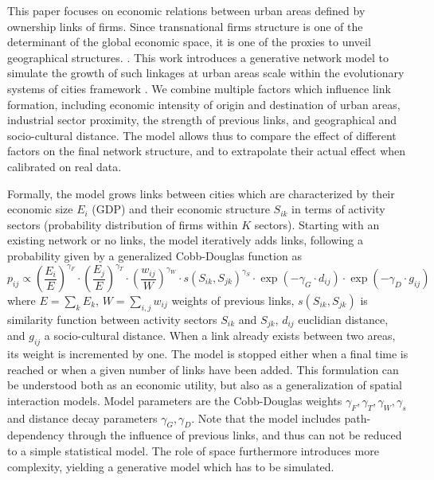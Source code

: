 \documentclass[10pt,letterpaper]{article}
\newcommand{\ea}[1]{{\color{blue}  #1}}
\begin{document}
This paper focuses on economic relations between urban areas defined by ownership links of firms. Since transnational firms structure is one of the determinant of the global economic space, it is one of the proxies to unveil geographical structures. \cite{2019arXiv191014652Z}. 
\ea{This work} introduces a generative network model to simulate the growth of such linkages at urban areas scale within the evolutionary systems of cities framework \cite{pumain2018evolutionary}. 
We combine multiple factors which influence link formation, including economic intensity of origin and destination of urban areas, industrial sector proximity, the strength of previous links, and geographical and socio-cultural distance. The model allows thus to compare the effect of different factors on the final network structure, and to extrapolate their actual effect when calibrated on real data.



Formally, the model grows links between cities which are characterized by their economic size $E_i$ (GDP) and their economic structure $S_{ik}$ in terms of activity sectors (probability distribution of firms within $K$ sectors). Starting with an existing network or no links, the model iteratively adds links, following a probability given by a generalized Cobb-Douglas function \cite{vilcu2011geometric} as 
\[
p_{ij} \propto \left(\frac{E_{i}}{E}\right)^{\gamma_F} \cdot \left(\frac{E_{j}}{E}\right)^{\gamma_T} \cdot \left(\frac{w_{ij}}{W}\right)^{\gamma_W} \cdot s\left(S_{ik},S_{jk}\right)^{\gamma_S} \cdot \exp \left(- \gamma_G \cdot d_{ij}\right) \cdot \exp \left(- \gamma_D \cdot g_{ij}\right)
\]
where $E  =  \sum_k E_k$, $W  = \sum_{i,j} w_{ij}$ weights of previous links, \ea{$s(S_{ik},S_{jk})$ is similarity function between activity sectors $S_{ik}$ and $S_{jk}$}, $d_{ij}$ euclidian distance, and $g_{ij}$ a socio-cultural distance. When a link already exists between two areas, its weight is incremented by one. The model is stopped either when a final time is reached or when a given number of links have been added. This formulation can be understood both as an economic utility, but also as a generalization of spatial interaction models. Model parameters are the Cobb-Douglas weights $\gamma_F,\gamma_T,\gamma_W,\gamma_s$ and \ea{distance}
decay parameters $\gamma_G,\gamma_D$. Note that the model includes path-dependency through the influence of previous links, and thus can not be reduced to a simple statistical model. The role of space furthermore introduces more complexity, yielding a generative model which has to be simulated.
\end{document}
